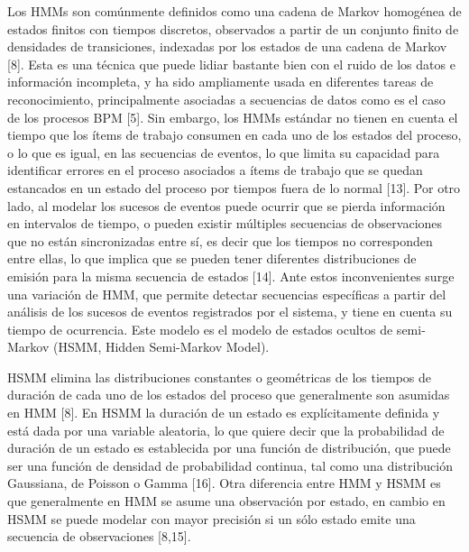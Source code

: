 Los HMMs son comúnmente definidos como una cadena de Markov homogénea de estados finitos con tiempos discretos, observados a partir de un conjunto finito de densidades de transiciones, indexadas por los estados de una cadena de Markov [8]. Esta es una técnica que puede lidiar bastante bien con el ruido de los datos e información incompleta, y ha sido ampliamente usada en diferentes tareas de reconocimiento, principalmente asociadas a secuencias de datos como es el caso de los procesos BPM [5]. Sin embargo, los HMMs estándar no tienen en cuenta el tiempo que los ítems de trabajo consumen en cada uno de los estados del proceso, o lo que es igual, en las secuencias de eventos, lo que limita su capacidad para identificar errores en el proceso asociados a ítems de trabajo que se quedan estancados en un estado del proceso por tiempos fuera de lo normal [13]. Por otro lado, al modelar los sucesos de eventos puede ocurrir que se pierda información en intervalos de tiempo, o pueden existir múltiples secuencias de observaciones que no están sincronizadas entre sí, es decir que los tiempos no corresponden entre ellas, lo que implica que se pueden tener diferentes distribuciones de emisión para la misma secuencia de estados [14]. Ante estos inconvenientes surge una variación de HMM, que permite detectar secuencias específicas a partir del análisis de los sucesos de eventos registrados por el sistema, y tiene en cuenta su tiempo de ocurrencia. Este modelo es el modelo de estados ocultos de semi-Markov (HSMM, Hidden Semi-Markov Model).

HSMM elimina las distribuciones constantes o geométricas de los tiempos de duración de cada uno de los estados del proceso que generalmente son asumidas en HMM [8]. En HSMM la duración de un estado es explícitamente definida y está dada por una variable aleatoria, lo que quiere decir que la probabilidad de duración de un estado es establecida por una función de distribución, que puede ser una función de densidad de probabilidad continua, tal como una distribución Gaussiana, de Poisson o Gamma [16]. Otra diferencia entre HMM y HSMM es que generalmente en HMM se asume una observación por estado, en cambio en HSMM se puede modelar con mayor precisión si un sólo estado emite una secuencia de observaciones [8,15].

